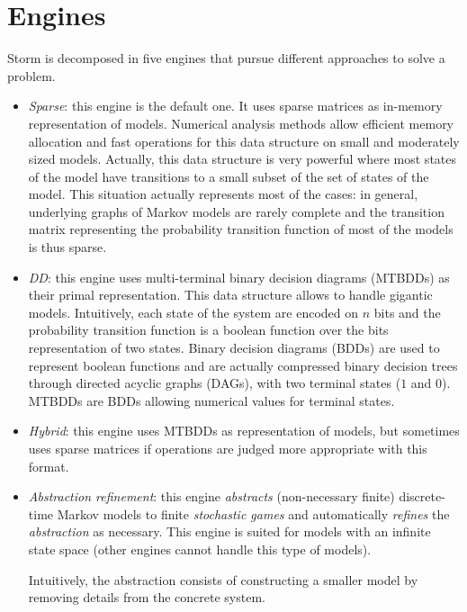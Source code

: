 \section{Engines}\label{engines}
Storm is decomposed in five engines that pursue different approaches to solve a problem.
\begin{itemize}
  \item \textit{Sparse}: this engine is the default one. It uses sparse matrices as in-memory representation of models. Numerical analysis methods allow efficient memory allocation and fast operations for this data structure on small and moderately sized models.
  Actually, this data structure is very powerful where most states of the model have transitions to a small subset of the set of states of the model. This situation actually represents most of the cases: in general, underlying graphs of Markov models are rarely complete and the transition matrix representing the probability transition function of
  most of the models is thus sparse.
  \item \textit{DD}: this engine uses multi-terminal binary decision diagrams (MTBDDs) \cite{Fujita:1997:MBD:607541.607565} as their primal representation. This data structure allows
  to handle gigantic models. Intuitively, each state of the system are encoded on $n$ bits and the probability transition function is a boolean function
  over the bits representation of two states. Binary decision diagrams (BDDs) \cite{PMC} are
  used to represent boolean functions and are actually compressed binary decision trees through directed acyclic graphs (DAGs), with two terminal states ($1$ and $0$). MTBDDs are BDDs allowing numerical values for terminal states.
  \item \textit{Hybrid}: this engine uses MTBDDs as representation of models, but sometimes uses sparse matrices if operations are judged more appropriate with this format.
  \item \textit{Abstraction refinement}: this engine \textit{abstracts} (non-necessary finite) discrete-time Markov models to finite \textit{stochastic games} and automatically \textit{refines} the \textit{abstraction} as necessary. This engine is suited for models with an infinite state space (other engines cannot handle this type of models).
  \par Intuitively, the abstraction consists of constructing a smaller model by removing details from the concrete system.

\end{itemize}
